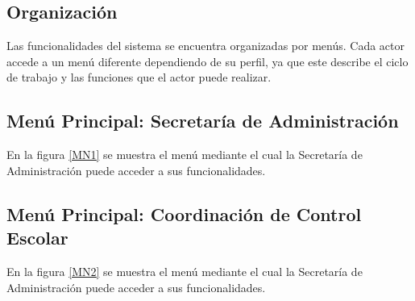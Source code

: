   






  
\subsection{Organización}
Las funcionalidades del sistema se encuentra organizadas por menús. Cada actor accede a un menú diferente dependiendo de su perfil, ya que este describe el ciclo de trabajo y las funciones que el actor puede realizar.


\hypertarget{menu:SecretariaAdministracion}{}	
\subsection{Menú Principal: Secretaría de Administración}
En la figura \ref{MN1} se muestra el menú mediante el cual la Secretaría de Administración puede acceder a sus funcionalidades.

\hypertarget{menu:CoordinacionControlEscolar}{}	
\subsection{Menú Principal: Coordinación de Control Escolar}
En la figura \ref{MN2} se muestra el menú mediante el cual la Secretaría de Administración puede acceder a sus funcionalidades.
